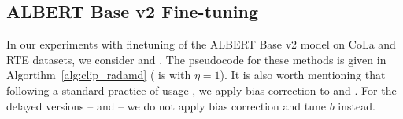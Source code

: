 \documentclass{article}
\begin{document}


\subsection{ALBERT Base v2 Fine-tuning}\label{appendix:albert}

In our experiments with finetuning of the ALBERT Base v2 model on CoLa and RTE datasets, we consider  and . The pseudocode for these methods is given in Algortihm~\ref{alg:clip_radamd} ( is  with $\eta = 1$). It is also worth mentioning that following a standard practice of usage , we apply bias correction to  and . For the delayed versions --  and  -- we do not apply bias correction and tune $b$ instead.
\end{document}
